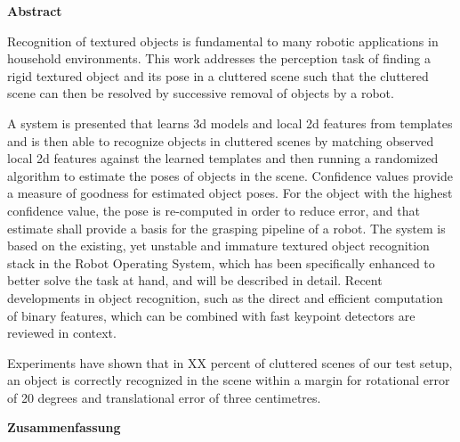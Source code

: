 

\clearemptydoublepage
{}
{}	

\vspace*{2cm}
\begin{center}
{\Large \bf Abstract}
\end{center}
\vspace{1cm}

Recognition of textured objects is fundamental to many robotic applications in
household environments. This work addresses the perception task of finding a
rigid textured object and its pose in a cluttered scene such that the cluttered
scene can then be resolved by successive removal of objects by a robot.

A system is presented that learns 3d models and local 2d features from
templates and is then able to recognize objects in cluttered scenes by matching
observed local 2d features against the learned templates and then running a
randomized algorithm to estimate the poses of objects in the scene. Confidence
values provide a measure of goodness for estimated object poses. For the object
with the highest confidence value, the pose is re-computed in order to reduce
error, and that estimate shall provide a basis for the grasping pipeline of a
robot. The system is based on the existing, yet unstable and immature textured
object recognition stack in the Robot Operating System, which has been
specifically enhanced to better solve the task at hand, and will be described
in detail. Recent developments in object recognition, such as the direct and
efficient computation of binary features, which can be combined with fast
keypoint detectors are reviewed in context.

Experiments have shown that in XX percent of cluttered scenes of our test
setup, an object is correctly recognized in the scene within a margin for
rotational error of 20 degrees and translational error of three centimetres.

\clearemptydoublepage
{}
{}

\vspace*{2cm}
\begin{center}
{\Large \bf Zusammenfassung}
\end{center}
\vspace{1cm}


